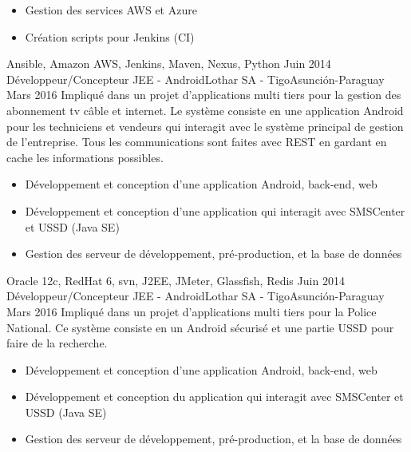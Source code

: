 \begin{experiences}
{\begin{itemize}
                        \item Gestion des services AWS et Azure
                        \item Création scripts pour Jenkins (CI)
                      \end{itemize}
                    }
                    {Ansible, Amazon AWS, Jenkins, Maven, Nexus, Python}
  \emptySeparator
  \projectexperiences
    {Juin 2014}  {Développeur/Concepteur JEE - Android}{Lothar SA - Tigo}{Asunción-Paraguay}
    {Mars 2016}
                 {Impliqué dans un projet d'applications multi tiers pour la gestion des abonnement tv câble et internet.
                 Le système consiste en une application Android pour les techniciens et vendeurs qui interagit avec le système
                 principal de gestion de l'entreprise. Tous les communications sont faites avec REST en gardant en cache les
                 informations possibles.
                }
                 {
                      \begin{itemize}
                        \item Développement et conception d'une application Android, back-end, web
                        \item Développement et conception d’une application qui interagit avec SMSCenter et USSD (Java SE)
                        \item Gestion des serveur de développement, pré-production, et la base de données
                      \end{itemize}
                 }
                 {Oracle 12c, RedHat 6, svn, J2EE, JMeter, Glassfish, Redis}
  \emptySeparator
  \projectexperiences
    {Juin 2014}  {Développeur/Concepteur JEE - Android}{Lothar SA - Tigo}{Asunción-Paraguay}
    {Mars 2016}
                 {Impliqué dans un projet d'applications multi tiers pour la Police National. Ce système
                 consiste en un Android sécurisé et une partie USSD pour faire de la recherche.
                }
                 {
                      \begin{itemize}
                        \item Développement et conception d'une application Android, back-end, web
                        \item Développement et conception du application qui interagit avec SMSCenter et USSD (Java SE)
                        \item Gestion des serveur de développement, pré-production, et la base de données
                      \end{itemize}
}
\end{experiences}

